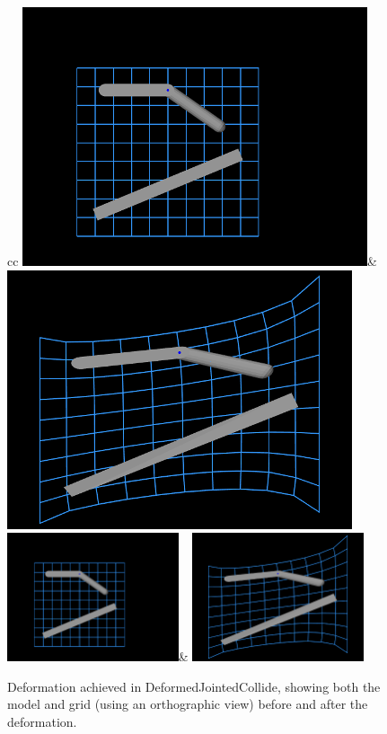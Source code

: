 \begin{figure}[ht]
\begin{center}
  \begin{tabular}{cc}
  \iflatexml
    \includegraphics[]{images/DeformedJointedCollideBefore}&
    \includegraphics[]{images/DeformedJointedCollideAfter}
  \else
    \includegraphics[width=0.45\textwidth]{images/DeformedJointedCollideBefore}&
    \includegraphics[width=0.45\textwidth]{images/DeformedJointedCollideAfter}
  \fi
  \end{tabular}
\end{center}
\caption{Deformation achieved in DeformedJointedCollide,
showing both the model and grid (using an orthographic view)
before and after the deformation.}
\label{JointedCollideDeformation:fig}
\end{figure}

